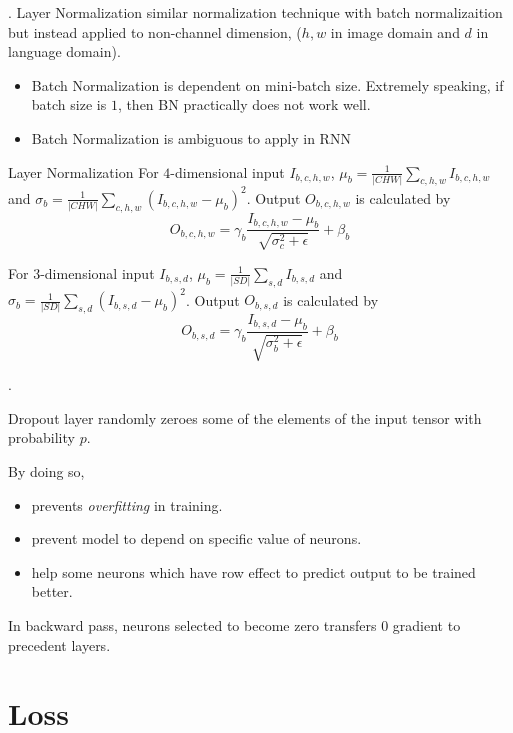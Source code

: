 \documentclass[8pt]{beamer}
\newcommand{\ti}[1]{\textit{#1}}
\newcommand{\abs}[1]{\left\lvert #1 \right\rvert}
\begin{document}
\begin{frame}{.}
    Layer Normalization similar normalization technique with batch normalizaition but instead applied to non-channel dimension, ($h,w$ in image domain and $d$ in language domain).
    \begin{itemize}
        \item Batch Normalization is dependent on mini-batch size. Extremely speaking, if batch size is $1$, then BN practically does not work well.
        \item Batch Normalization is ambiguous to apply in RNN
    \end{itemize}

    \begin{block}{Layer Normalization}
        For $4$-dimensional input $I_{b,c,h,w}$, $\mu_b = \frac{1}{\abs{C H W}}\sum_{c,h,w} I_{b,c,h,w}$ and $\sigma_b = \frac{1}{\abs{C H W}} \sum_{c,h,w} (I_{b,c,h,w} - \mu_b)^2$. Output $O_{b,c,h,w}$ is calculated by
        \[
            O_{b,c,h,w} = \gamma_b \frac{I_{b,c,h,w} - \mu_b}{\sqrt{\sigma_c^2 + \epsilon}} + \beta_b
        \]

        For $3$-dimensional input $I_{b,s,d}$, $\mu_b = \frac{1}{\abs{S D}}\sum_{s,d} I_{b,s,d}$ and $\sigma_b = \frac{1}{\abs{S D}} \sum_{s,d} (I_{b,s,d} - \mu_b)^2$. Output $O_{b,s,d}$ is calculated by
        \[
            O_{b,s,d} = \gamma_b \frac{I_{b,s,d} - \mu_b}{\sqrt{\sigma_b^2 + \epsilon}} + \beta_b
        \]
    \end{block}
\end{frame}


\begin{frame}{.}

    Dropout layer randomly zeroes some of the elements of the input tensor with probability $p$.

    By doing so,
    \begin{itemize}
        \item prevents \ti{overfitting} in training.
        \item prevent model to depend on specific value of neurons.
        \item help some neurons which have row effect to predict output to be trained better.
    \end{itemize}

    In backward pass, neurons selected to become zero transfers $0$ gradient to precedent layers.
\end{frame}

\section{Loss}
\end{document}
